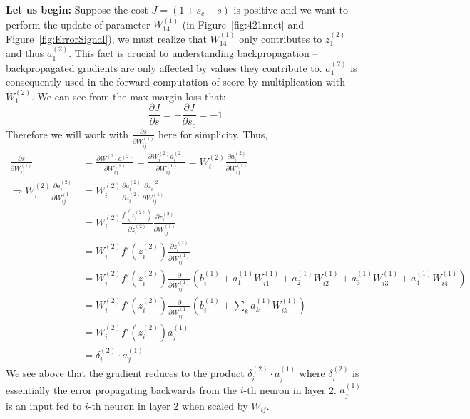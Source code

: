 \documentclass{tufte-handout}
\begin{document}
\textbf{Let us begin:} Suppose the cost $J = (1 + s_c - s)$ is positive and we want to perform the update of parameter $W^{(1)}_{14}$ (in Figure~\ref{fig:421nnet} and Figure~\ref{fig:ErrorSignal}), we must realize that $W^{(1)}_{14}$ only contributes to $z_1^{(2)}$ and thus $a_1^{(2)}$. This fact is crucial to understanding backpropagation -- backpropagated gradients are only affected by values they contribute to. $a_1^{(2)}$ is consequently used in the forward computation of score by multiplication with $W^{(2)}_{1}$. We can see from the max-margin loss that:
$$\frac{\partial J}{\partial s} = - \frac{\partial J}{\partial s_c} =  -1$$
Therefore we will work with $\frac{\partial s}{\partial W^{(1)}_{ij}}$ here for simplicity. Thus,
\begin{align*}
\frac{\partial s}{\partial W^{(1)}_{ij}} &= \frac{\partial W^{(2)} a^{(2)}}{\partial W^{(1)}_{ij}} = \frac{\partial W^{(2)}_{i} a^{(2)}_i}{\partial W^{(1)}_{ij}} = W^{(2)}_{i} \frac{\partial a^{(2)}_i}{\partial W^{(1)}_{ij}}\\
\Rightarrow W^{(2)}_{i} \frac{\partial a^{(2)}_i}{\partial W^{(1)}_{ij}} &=  W^{(2)}_{i} \frac{\partial a^{(2)}_i}{\partial z^{(2)}_i} \frac{\partial z^{(2)}_i}{\partial W^{(1)}_{ij}}\\
&=  W^{(2)}_{i} \frac{f(z^{(2)}_i)}{\partial z^{(2)}_i} \frac{\partial z^{(2)}_i}{\partial W^{(1)}_{ij}}\\
&=  W^{(2)}_{i} f'(z^{(2)}_i) \frac{\partial z^{(2)}_i}{\partial W^{(1)}_{ij}}\\
&=  W^{(2)}_{i} f'(z^{(2)}_i) \frac{\partial}{\partial W^{(1)}_{ij}} (b^{(1)}_i + a_1^{(1)}  W^{(1)}_{i1} + a_2^{(1)}  W^{(1)}_{i2} + a_3^{(1)}  W^{(1)}_{i3} + a_4^{(1)}  W^{(1)}_{i4})\\
&=  W^{(2)}_{i} f'(z^{(2)}_i) \frac{\partial}{\partial W^{(1)}_{ij}} (b^{(1)}_i + \sum_k a_k^{(1)}  W^{(1)}_{ik})\\
&=  W^{(2)}_{i} f'(z^{(2)}_i) a_j^{(1)}\\
&=  \delta_i^{(2)} \cdot a_j^{(1)}
\end{align*}
We see above that the gradient reduces to the product $\delta_i^{(2)} \cdot a_j^{(1)}$ where $\delta_i^{(2)}$ is essentially the error propagating backwards from the $i$-th neuron in layer 2. $a_j^{(1)}$ is an input fed to $i$-th neuron in layer $2$ when scaled by $W_{ij}$.
\end{document}
